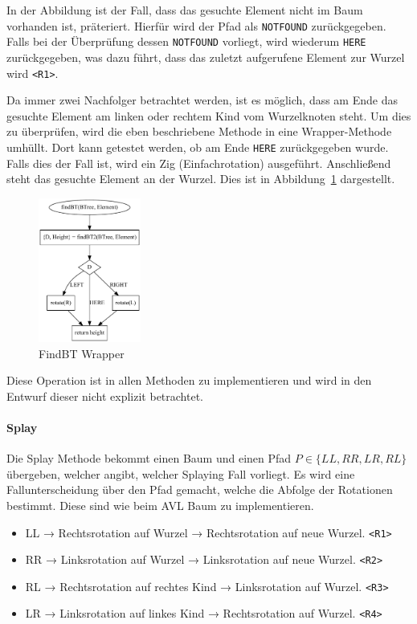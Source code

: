 In der Abbildung ist der Fall, dass das gesuchte Element nicht im Baum vorhanden ist, präteriert.
Hierfür wird der Pfad als \verb|NOTFOUND| zurückgegeben.
Falls bei der Überprüfung dessen \verb|NOTFOUND| vorliegt, wird wiederum \verb|HERE|
zurückgegeben, was dazu führt, dass das zuletzt aufgerufene Element zur Wurzel wird \verb|<R1>|.

Da immer zwei Nachfolger betrachtet werden, ist es möglich, dass am Ende das gesuchte Element
am linken oder rechtem Kind vom Wurzelknoten steht.
Um dies zu überprüfen, wird die eben beschriebene Methode in eine Wrapper-Methode umhüllt.
Dort kann getestet werden, ob am Ende \verb|HERE| zurückgegeben wurde.
Falls dies der Fall ist, wird ein Zig (Einfachrotation) ausgeführt.
Anschließend steht das gesuchte Element an der Wurzel.
Dies ist in Abbildung~\ref{fig:splayFind2} dargestellt.
\begin{figure}[hbt]
    \centering
    \includegraphics[width=0.3\textwidth]{img/gv/splayFind}
    \caption{FindBT Wrapper}
    \label{fig:splayFind2}
\end{figure}
Diese Operation ist in allen Methoden zu implementieren und wird in den Entwurf dieser nicht
explizit betrachtet.

\paragraph{Splay}\label{par:splay}
Die Splay Methode bekommt einen Baum und einen Pfad \(P \in \{LL, RR, LR, RL\}\) übergeben,
welcher angibt, welcher Splaying Fall vorliegt.
Es wird eine Fallunterscheidung über den Pfad gemacht, welche die Abfolge der Rotationen bestimmt.
Diese sind wie beim AVL Baum zu implementieren.
\begin{itemize}
    \item LL → Rechtsrotation auf Wurzel → Rechtsrotation auf neue Wurzel. \verb|<R1>|
    \item RR → Linksrotation auf Wurzel → Linksrotation auf neue Wurzel. \verb|<R2>|
    \item RL → Rechtsrotation auf rechtes Kind → Linksrotation auf Wurzel. \verb|<R3>|
    \item LR → Linksrotation auf linkes Kind → Rechtsrotation auf Wurzel. \verb|<R4>|
\end{itemize}

